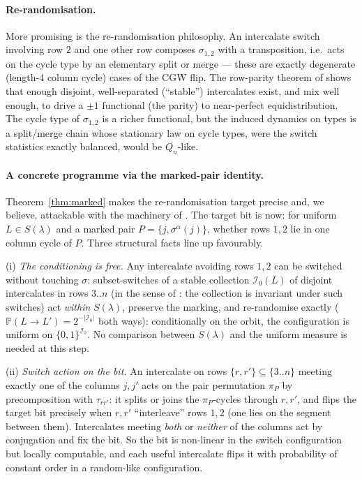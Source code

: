 \documentclass[11pt]{article}
\theoremstyle{definition}
\renewcommand{\Pr}{\mathbb{P}}
\newcommand{\QQ}{Q}
\begin{document}
\paragraph{Re-randomisation.}  More promising is the \cite{KPS25}
re-randomisation philosophy.  An intercalate switch involving row $2$ and
one other row composes $\sigma_{1,2}$ with a transposition, i.e.\ acts on
the cycle type by an elementary split or merge --- these are exactly
degenerate (length-4 column cycle) cases of the CGW flip.  The row-parity
theorem of \cite{KPS25} shows that enough disjoint, well-separated
(``stable'') intercalates exist, and mix well enough, to drive a
$\pm1$ functional (the parity) to near-perfect equidistribution.  The cycle
type of $\sigma_{1,2}$ is a richer functional, but the induced dynamics on
types is a split/merge chain whose stationary law on cycle types, were the
switch statistics exactly balanced, would be $\QQ_n$-like.

\paragraph{A concrete programme via the marked-pair identity.}
Theorem~\ref{thm:marked} makes the re-randomisation target precise and,
we believe, attackable with the machinery of \cite{KPS25}.  The target
bit is now: for uniform $L\in S(\lambda)$ and a marked pair
$P=\{j,\sigma^\alpha(j)\}$, whether rows $1,2$ lie in one column cycle
of $P$.  Three structural facts line up favourably.

(i) \emph{The conditioning is free.}  Any intercalate avoiding rows
$1,2$ can be switched without touching $\sigma$: subset-switches of a
stable collection $\mathcal I_0(L)$ of disjoint intercalates in rows
$3..n$ (in the sense of \cite[\S7]{KPS25}: the collection is invariant
under such switches) act \emph{within} $S(\lambda)$, preserve the
marking, and re-randomise exactly ($\Pr(L\to L')=2^{-|\mathcal I_0|}$
both ways): conditionally on the orbit, the configuration is uniform
on $\{0,1\}^{\mathcal I_0}$.  No comparison between $S(\lambda)$ and
the uniform measure is needed at this step.

(ii) \emph{Switch action on the bit.}  An intercalate on rows
$\{r,r'\}\subseteq\{3..n\}$ meeting exactly one of the columns $j,j'$
acts on the pair permutation $\pi_P$ by precomposition with
$\tau_{rr'}$: it splits or joins the $\pi_P$-cycles through $r,r'$,
and flips the target bit precisely when $r,r'$ ``interleave'' rows
$1,2$ (one lies on the segment between them).  Intercalates meeting
\emph{both} or \emph{neither} of the columns act by conjugation and
fix the bit.  So the bit is non-linear in the switch configuration but
locally computable, and each useful intercalate flips it with
probability of constant order in a random-like configuration.
\end{document}
